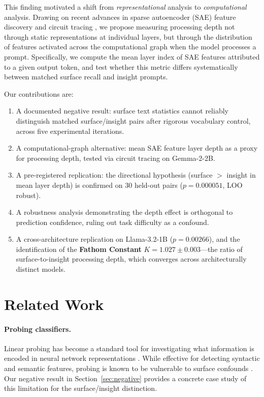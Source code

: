 \documentclass[10pt]{article}
\begin{document}
This finding motivated a shift from \textit{representational} analysis to \textit{computational} analysis. Drawing on recent advances in sparse autoencoder (SAE) feature discovery \citep{cunningham2023sparse, bricken2023monosemanticity} and circuit tracing \citep{anthropic2025biology}, we propose measuring processing depth not through static representations at individual layers, but through the distribution of features activated across the computational graph when the model processes a prompt. Specifically, we compute the mean layer index of SAE features attributed to a given output token, and test whether this metric differs systematically between matched surface recall and insight prompts.

Our contributions are:
\begin{enumerate}
    \item A documented negative result: surface text statistics cannot reliably distinguish matched surface/insight pairs after rigorous vocabulary control, across five experimental iterations.
    \item A computational-graph alternative: mean SAE feature layer depth as a proxy for processing depth, tested via circuit tracing on Gemma-2-2B.
    \item A pre-registered replication: the directional hypothesis (surface $>$ insight in mean layer depth) is confirmed on 30 held-out pairs ($p{=}0.000051$, LOO robust).
    \item A robustness analysis demonstrating the depth effect is orthogonal to prediction confidence, ruling out task difficulty as a confound.
    \item A cross-architecture replication on Llama-3.2-1B ($p{=}0.00266$), and the identification of the \textbf{Fathom Constant} $K{=}1.027 \pm 0.003$---the ratio of surface-to-insight processing depth, which converges across architecturally distinct models.
\end{enumerate}

\section{Related Work}

\paragraph{Probing classifiers.}
Linear probing has become a standard tool for investigating what information is encoded in neural network representations \citep{belinkov2022probing, hewitt2019structural}. While effective for detecting syntactic and semantic features, probing is known to be vulnerable to surface confounds \citep{hewitt2019designing}. Our negative result in Section~\ref{sec:negative} provides a concrete case study of this limitation for the surface/insight distinction.
\end{document}
